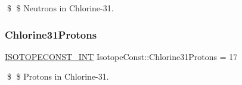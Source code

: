 \$ \$ Neutrons in Chlorine-\/31. \mbox{\label{group___isotope_const-_chlorine-_cl31_ga37ec5aaf682e927a7da090a0e728ada8}} 
\subsubsection{\texorpdfstring{Chlorine31\+Protons}{Chlorine31Protons}}
{\footnotesize\ttfamily \mbox{\hyperlink{group___isotope_const-_macros_ga5f18360b3e99483a35c32d789e62621c}{I\+S\+O\+T\+O\+P\+E\+C\+O\+N\+S\+T\+\_\+\+I\+NT}} Isotope\+Const\+::\+Chlorine31\+Protons = 17}

\$ \$ Protons in Chlorine-\/31. 